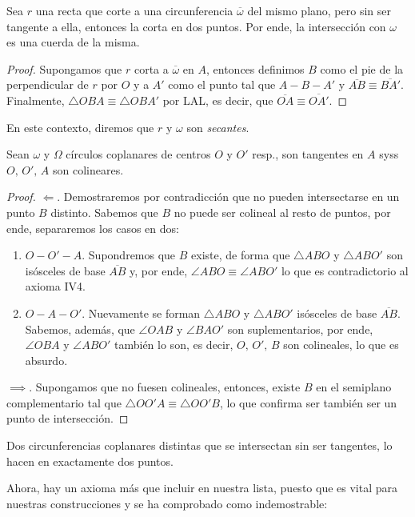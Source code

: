 \documentclass[11pt,a4paper]{book}
\begin{document}
\begin{thm}
Sea $r$ una recta que corte a una circunferencia $\overline{\omega}$ del mismo plano, pero sin ser tangente a ella, entonces la corta en dos puntos. Por ende, la intersección con $\omega$ es una cuerda de la misma.
\end{thm}
\begin{proof}
Supongamos que $r$ corta a $\overline{\omega}$ en $A$, entonces definimos $B$ como el pie de la perpendicular de $r$ por $O$ y a $A'$ como el punto tal que $A-B-A'$ y $\overline{AB}\equiv\overline{BA'}$. Finalmente, $\triangle OBA\equiv\triangle OBA'$ por LAL, es decir, que $\overline{OA}\equiv\overline{OA'}$.
\end{proof}
En este contexto, diremos que $r$ y $\omega$ son \textit{secantes}.
\begin{prop}
Sean $\omega$ y $\Omega$ círculos coplanares de centros $O$ y $O'$ resp., son tangentes en $A$ syss $O,\,O',\,A$ son colineares.
\end{prop}
\begin{proof}
$\Longleftarrow$. Demostraremos por contradicción que no pueden intersectarse en un punto $B$ distinto. Sabemos que $B$ no puede ser colineal al resto de puntos, por ende, separaremos los casos en dos:
\begin{enumerate}
\item $O-O'-A$. Supondremos que $B$ existe, de forma que $\triangle ABO$ y $\triangle ABO'$ son isósceles de base $\overline{AB}$ y, por ende, $\angle ABO\equiv\angle ABO'$ lo que es contradictorio al axioma IV4.
\item $O-A-O'$. Nuevamente se forman $\triangle ABO$ y $\triangle ABO'$ isósceles de base $\overline{AB}$. Sabemos, además, que $\angle OAB$ y $\angle BAO'$ son suplementarios, por ende, $\angle OBA$ y $\angle ABO'$ también lo son, es decir, $O,\,O',\,B$ son colineales, lo que es absurdo.
\end{enumerate}
$\implies$. Supongamos que no fuesen colineales, entonces, existe $B$ en el semiplano complementario tal que $\triangle OO'A\equiv\triangle OO'B$, lo que confirma ser también ser un punto de intersección.
\end{proof}
\begin{cor}
Dos circunferencias coplanares distintas que se intersectan sin ser tangentes, lo hacen en exactamente dos puntos.
\end{cor}
Ahora, hay un axioma más que incluir en nuestra lista, puesto que es vital para nuestras construcciones y se ha comprobado como indemostrable:
\end{document}
